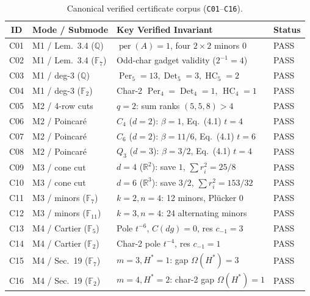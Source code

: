 \documentclass[10pt,twocolumn]{article}
\begin{document}
\begin{table}[t]
\centering
\scriptsize
\setlength{\tabcolsep}{2.6pt}
\caption{Canonical verified certificate corpus (\texttt{C01}--\texttt{C16}).}
\label{tab:corpus}
\begin{tabular}{@{}clll@{}}
\toprule
ID & Mode / Submode & Key Verified Invariant & Status \\
\midrule
C01 & M1 / Lem.~3.4 ($\mathbb{Q}$) & $\operatorname{per}(A){=}1$, four $2{\times}2$ minors $0$ & PASS \\
C02 & M1 / Lem.~3.4 ($\mathbb{F}_7$) & Odd-char gadget validity ($2^{-1}{=}4$) & PASS \\
C03 & M1 / deg-3 ($\mathbb{Q}$) & $\operatorname{Per}_5{=}13, \operatorname{Det}_5{=}3, \operatorname{HC}_5{=}2$ & PASS \\
C04 & M1 / deg-3 ($\mathbb{F}_2$) & Char-2 $\operatorname{Per}_4{=}\operatorname{Det}_4{=}1$, $\operatorname{HC}_4{=}1$ & PASS \\
C05 & M2 / 4-row cuts & $q{=}2$: sum ranks $(5,5,8) > 4$ & PASS \\
C06 & M2 / Poincar\'e & $C_4$ ($d{=}2$): $\beta{=}1$, Eq.~(4.1) $t{=}4$ & PASS \\
C07 & M2 / Poincar\'e & $C_6$ ($d{=}2$): $\beta{=}11/6$, Eq.~(4.1) $t{=}6$ & PASS \\
C08 & M2 / Poincar\'e & $Q_3$ ($d{=}3$): $\beta{=}3/2$, Eq.~(4.1) $t{=}4$ & PASS \\
C09 & M3 / cone cut & $d{=}4$ ($\mathbb{R}^2$): save $1$, $\sum r_i^2{=}25/8$ & PASS \\
C10 & M3 / cone cut & $d{=}6$ ($\mathbb{R}^3$): save $3/2$, $\sum r_i^2{=}153/32$ & PASS \\
C11 & M3 / minors ($\mathbb{F}_7$) & $k{=}2,n{=}4$: 12 minors, Pl\"ucker $0$ & PASS \\
C12 & M3 / minors ($\mathbb{F}_{11}$) & $k{=}3,n{=}4$: 24 alternating minors & PASS \\
C13 & M4 / Cartier ($\mathbb{F}_5$) & Pole $t^{-6}$, $C(dg){=}0$, res $c_{-1}{=}3$ & PASS \\
C14 & M4 / Cartier ($\mathbb{F}_2$) & Char-2 pole $t^{-4}$, res $c_{-1}{=}1$ & PASS \\
C15 & M4 / Sec.~19 ($\mathbb{F}_7$) & $m{=}3,H^*{=}1$: gap $\Omega(H^*){=}3$ & PASS \\
C16 & M4 / Sec.~19 ($\mathbb{F}_2$) & $m{=}4,H^*{=}2$: char-2 gap $\Omega(H^*){=}1$ & PASS \\
\bottomrule
\end{tabular}
\end{table}
\end{document}

